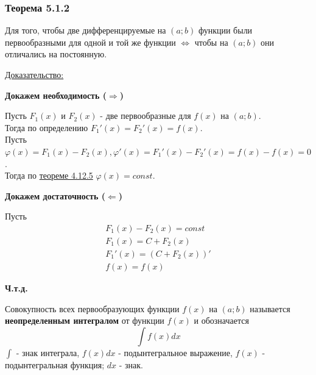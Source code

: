 \documentclass[12pt]{article}
\begin{document}
    \subsubsection*{Теорема 5.1.2}\label{th:5.1.2}
    Для того, чтобы две дифференцируемые на $(a;b)$ функции были первообразными для одной и той же функции $\Longleftrightarrow$ чтобы на $(a; b)$ они отличались на постоянную.\par\noindent
    \underline{Доказательство:}
    \begin{adjustwidth}{1.5em}{1.5em}
        \textbf{Докажем необходимость ($\Rightarrow$)}\par\noindent
        Пусть $F_1(x)$ и $F_2(x)$ - две первообразные для $f(x)$ на $(a; b)$.\\
        Тогда по определению $F_1'(x) = F_2'(x) = f(x)$.\\
        Пусть $\varphi(x) = F_1(x) - F_2(x), \varphi'(x) = F_1'(x) - F_2'(x) = f(x) - f(x) = 0$.\\
        Тогда по \hyperref[th:4.12.5]{теореме 4.12.5} $\varphi(x) = const$.\par\noindent
        \textbf{Докажем достаточность ($\Leftarrow$)}\par\noindent
        Пусть
        \begin{gather*}
            F_1(x) - F_2(x) = const\\
            F_1(x) = C + F_2(x)\\
            F_1'(x) = (C + F_2(x))'\\
            f(x) = f(x)
        \end{gather*}
        \begin{center}
            \textbf{Ч.т.д.}
        \end{center}
    \end{adjustwidth}
    Совокупность всех первообразующих функции $f(x)$ на $(a; b)$ называется \textbf{неопределенным интегралом} от функции $f(x)$ и обозначается 
    \[ \int f(x)dx \]
    $\int$ - знак интеграла, $f(x)dx$ - подынтегральное выражение, $f(x)$ - подынтегральная функция; $dx$ - знак.
    
\end{document}
